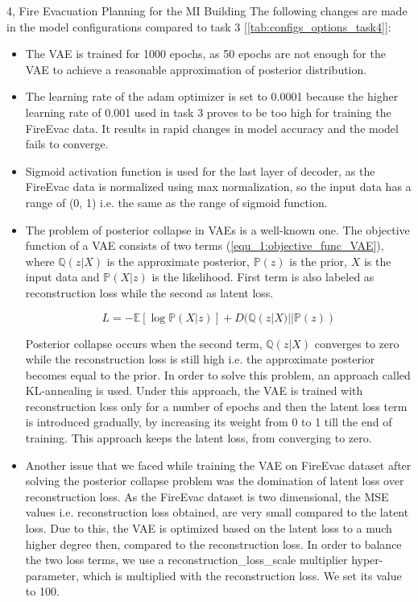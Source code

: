 \documentclass[10pt,a4paper]{article}
\begin{document}
\begin{task}{4, Fire Evacuation Planning for the MI Building}
The following changes are made in the model configurations compared to task 3 [\ref{tab:configs_options_task4}]:
	\begin{itemize}
		\item The VAE is trained for 1000 epochs, as 50 epochs are not enough for the VAE to achieve a reasonable approximation of posterior distribution. 
		\item The learning rate of the adam optimizer is set to 0.0001 because the higher learning rate of 0.001 used in task 3 proves to be too high for training the FireEvac data. It results in rapid changes in model accuracy and the model fails to converge.
		\item Sigmoid activation function is used for the last layer of decoder, as the FireEvac data is normalized using max normalization, so the input data has a range of (0, 1) i.e. the same as the range of sigmoid function.
		\item The problem of posterior collapse in VAEs is a well-known one. The objective function of a VAE consists of two terms (\ref{equ_1:objective_func_VAE}), where $\mathbb{Q}(z|X)$ is the approximate posterior, $\mathbb{P}(z)$ is the prior, $X$ is the input data and $\mathbb{P}(X|z)$ is the likelihood. First term is also labeled as reconstruction loss while the second as latent loss.
		\begin{center}
		\begin{equation}
			\label{equ_1:objective_func_VAE}
			L = -\mathbb{E}[\log\mathbb{P}(X|z)] + D(\mathbb{Q}(z|X)||\mathbb{P}(z))
		\end{equation}
		\end{center}
			Posterior collapse occurs when the second term, $\mathbb{Q}(z|X)$ converges to zero while the reconstruction loss is still high i.e. the approximate posterior becomes equal to the prior. In order to solve this problem, an approach called KL-annealing is used. Under this approach, the VAE is trained with reconstruction loss only for a number of epochs and then the latent loss term is introduced gradually, by increasing its weight from 0 to 1 till the end of training. This approach keeps the latent loss, from converging to zero.
		\item Another issue that we faced while training the VAE on FireEvac dataset after solving the posterior collapse problem was the domination of latent loss over reconstruction loss. As the FireEvac dataset is two dimensional, the MSE values i.e. reconstruction loss obtained, are very small compared to the latent loss. Due to this, the VAE is optimized based on the latent loss to a much higher degree then, compared to the reconstruction loss. In order to balance the two loss terms, we use a reconstruction\_loss\_scale multiplier hyper-parameter, which is multiplied with the reconstruction loss. We set its value to 100.

\end{itemize}
\end{task}
\end{document}

